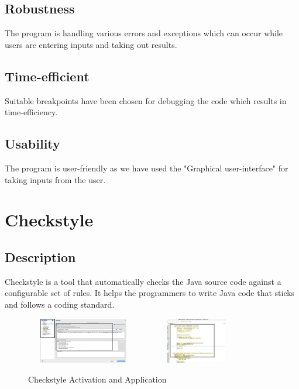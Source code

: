 \documentclass[12pt]{report}
\begin{document}
\subsection{\Large \vspace{0.2 cm}Robustness}
The program is handling various errors and exceptions which can occur while users are entering inputs and taking out results. 

\subsection{\Large \vspace{0.2 cm}Time-efficient}
Suitable breakpoints have been chosen for debugging the code which results in time-efficiency.

\subsection{\Large \vspace{0.2 cm}Usability}
The program is user-friendly as we have used the "Graphical user-interface" for taking inputs from the user.

\pagebreak

\section{\Large \vspace{0.1 cm}Checkstyle}

\subsection{\Large \vspace{0.1 cm}Description}
Checkstyle is a tool that automatically checks the Java source code  against a configurable set of rules. It helps the programmers to write Java code that sticks and follows a coding standard.


\begin{figure}[h!]
\begin{center}
  \includegraphics[width=5cm, height=2cm]{images/Activating Checkstyle tool.png}
  \includegraphics[width=5cm, height=2cm]{images/Applying checkStyle.jpeg}
  \end{center}
  \caption{Checkstyle Activation and Application}
\end{figure}
\end{document}

